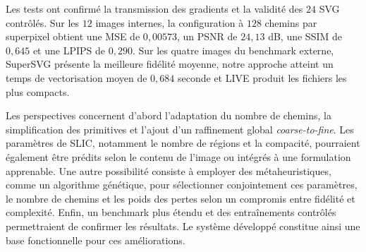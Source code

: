 \documentclass[12pt, a4paper, oneside]{report}
\begin{document}
Les tests ont confirmé la transmission des gradients et la validité des $24$ SVG contrôlés. Sur
les $12$ images internes, la configuration à $128$ chemins par superpixel obtient une MSE de
$0{,}00573$, un PSNR de $24{,}13$ dB, une SSIM de $0{,}645$ et une LPIPS de $0{,}290$.
Sur les quatre images du benchmark externe, SuperSVG présente la meilleure fidélité moyenne, notre approche atteint
un temps de vectorisation moyen de $0{,}684$ seconde et LIVE produit les fichiers les plus
compacts.

Les perspectives concernent d'abord l'adaptation du nombre de chemins, la simplification des
primitives et l'ajout d'un raffinement global \textit{coarse-to-fine}. Les paramètres de SLIC,
notamment le nombre de régions et la compacité, pourraient également être prédits selon le
contenu de l'image ou intégrés à une formulation apprenable. Une autre possibilité consiste à
employer des métaheuristiques, comme un algorithme génétique, pour sélectionner conjointement
ces paramètres, le nombre de chemins et les poids des pertes selon un compromis entre fidélité
et complexité. Enfin, un benchmark plus étendu et des entraînements contrôlés permettraient
de confirmer les résultats.
Le système développé constitue ainsi une base fonctionnelle pour ces améliorations.

\printbibliography[heading=bibintoc, title={Bibliographie}]

\end{document}
